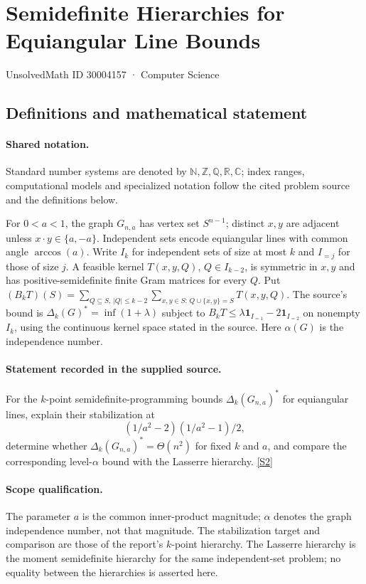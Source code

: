 \documentclass[11pt]{article}
\newcommand{\sref}[2]{\hyperlink{source:#1:#2}{[S#2]}}
\begin{document}
\setcounter{section}{30004156}
\section{Semidefinite Hierarchies for Equiangular Line Bounds}\label{30004157}
{\small\sffamily UnsolvedMath ID 30004157 · Computer Science}
\subsection{Definitions and mathematical statement}

\paragraph{Shared notation.}Standard number systems are denoted by $\mathbb N,\mathbb Z,\mathbb Q,\mathbb R,\mathbb C$; index ranges, computational models and specialized notation follow the cited problem source and the definitions below.


For $0<a<1$, the graph $G_{n,a}$ has vertex set $S^{n-1}$; distinct $x,y$ are adjacent unless $x\cdot y\in\{a,-a\}$. Independent sets encode equiangular lines with common angle $\arccos(a)$. Write $I_k$ for independent sets of size at most $k$ and $I_{=j}$ for those of size $j$. A feasible kernel $T(x,y,Q)$, $Q\in I_{k-2}$, is symmetric in $x,y$ and has positive-semidefinite finite Gram matrices for every $Q$. Put $(B_kT)(S)=\sum_{Q\subseteq S,\,|Q|\leq k-2}\sum_{x,y\in S:\,Q\cup\{x,y\}=S}T(x,y,Q)$. The source's bound is $\Delta_k(G)^*=\inf(1+\lambda)$ subject to $B_kT\leq\lambda\mathbf1_{I_{=1}}-2\mathbf1_{I_{=2}}$ on nonempty $I_k$, using the continuous kernel space stated in the source. Here $\alpha(G)$ is the independence number.
\paragraph{Statement recorded in the supplied source.}
For the $k$-point semidefinite-programming bounds $\Delta_k(G_{n,a})^*$ for equiangular lines, explain their stabilization at $$(1/a^2-2)(1/a^2-1)/2,$$ determine whether $\Delta_k(G_{n,a})^*=\Theta(n^2)$ for fixed $k$ and $a$, and compare the corresponding level-$\alpha$ bound with the Lasserre hierarchy. \sref{30004157}{2}
\paragraph{Scope qualification.}
The parameter $a$ is the common inner-product magnitude; $\alpha$ denotes the graph independence number, not that magnitude. The stabilization target and comparison are those of the report's $k$-point hierarchy. The Lasserre hierarchy is the moment semidefinite hierarchy for the same independent-set problem; no equality between the hierarchies is asserted here.
\end{document}

